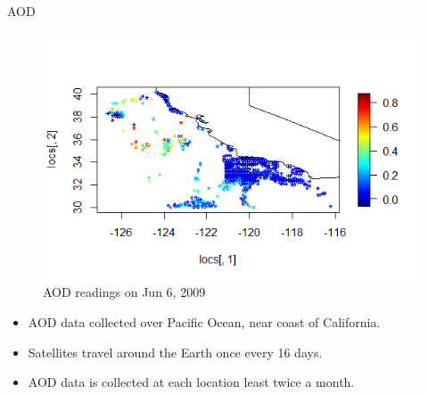 \documentclass[notheorems,envcountsect,allowframebreaks,xcolor=svgnames,8pt]{beamer}
\begin{document}
\begin{frame}{AOD}
\begin{figure}[H]
\centering
\includegraphics[scale=0.5]{AODpoints_06012009.png}
\caption{AOD readings on Jun 6, 2009}
\label{fig:locations}
\end{figure}

\begin{itemize}	
\item AOD data collected over Pacific Ocean, near coast of California.
\item Satellites travel around the Earth once every 16 days.
\item AOD data is collected at each location least twice a month.
\end{itemize}		
\end{frame}
\end{document}
